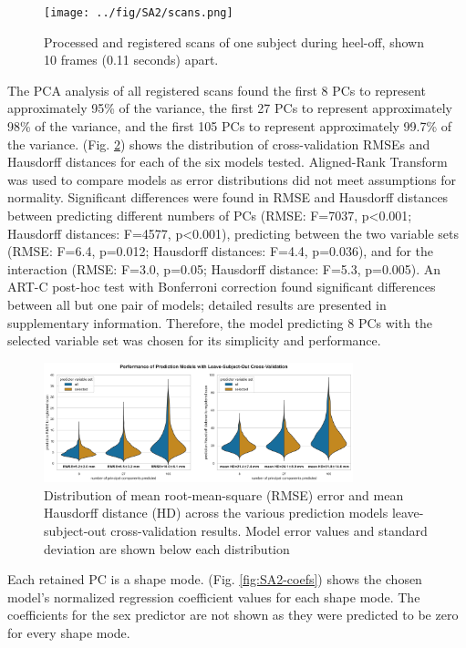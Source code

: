 \documentclass[defaultstyle,11pt]{comps}
\begin{document}
\begin{figure}
\hypertarget{fig:scans}{%
\centering
\texttt{[image: ../fig/SA2/scans.png]}
\caption{Processed and registered scans of one subject during heel-off, shown 10 frames (0.11 seconds) apart.}\label{fig:scans}
}
\end{figure}

The PCA analysis of all registered scans found the first 8 PCs to represent approximately 95\% of the variance, the first 27 PCs to represent approximately 98\% of the variance, and the first 105 PCs to represent approximately 99.7\% of the variance.
(Fig. \ref{fig:modelperf}) shows the distribution of cross-validation RMSEs and Hausdorff distances for each of the six models tested.
Aligned-Rank Transform \citep{Wobbrock2011} was used to compare models as error distributions did not meet assumptions for normality.
Significant differences were found in RMSE and Hausdorff distances between predicting different numbers of PCs (RMSE: F=7037, p\textless0.001; Hausdorff distances: F=4577, p\textless0.001), predicting between the two variable sets (RMSE: F=6.4, p=0.012; Hausdorff distances: F=4.4, p=0.036), and for the interaction (RMSE: F=3.0, p=0.05; Hausdorff distance: F=5.3, p=0.005).
An ART-C post-hoc test \citep{Elkin2021} with Bonferroni correction found significant differences between all but one pair of models; detailed results are presented in supplementary information.
Therefore, the model predicting 8 PCs with the selected variable set was chosen for its simplicity and performance.

\begin{figure}
\hypertarget{fig:modelperf}{%
\centering
\includegraphics[width=0.8\textwidth,height=\textheight]{../fig/SA2/modelPerformance.png}
\caption{Distribution of mean root-mean-square (RMSE) error and mean Hausdorff distance (HD) across the various prediction models leave-subject-out cross-validation results. Model error values and standard deviation are shown below each distribution}\label{fig:modelperf}
}
\end{figure}

Each retained PC is a shape mode.
(Fig. \ref{fig:SA2-coefs}) shows the chosen model's normalized regression coefficient values for each shape mode.
The coefficients for the sex predictor are not shown as they were predicted to be zero for every shape mode.
\end{document}
